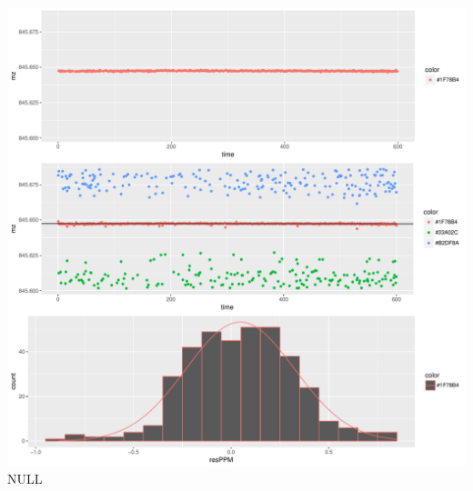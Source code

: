 \documentclass[]{article}
\begin{document}
\includegraphics{Supplementary_document_files/figure-latex/filter.lm.845-1.pdf}
NULL
\end{document}

